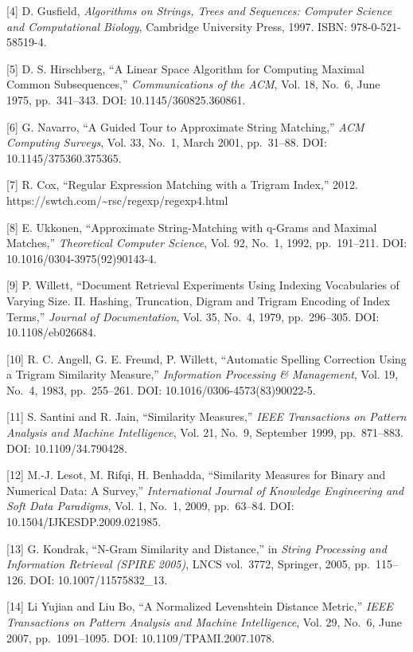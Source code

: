 \documentclass[
  11pt,
]{article}
\begin{document}
{[}4{]} D. Gusfield, \emph{Algorithms on Strings, Trees and Sequences:
Computer Science and Computational Biology}, Cambridge University Press,
1997. ISBN: 978-0-521-58519-4.

{[}5{]} D. S. Hirschberg, ``A Linear Space Algorithm for Computing
Maximal Common Subsequences,'' \emph{Communications of the ACM}, Vol.
18, No.~6, June 1975, pp.~341--343. DOI: 10.1145/360825.360861.

{[}6{]} G. Navarro, ``A Guided Tour to Approximate String Matching,''
\emph{ACM Computing Surveys}, Vol. 33, No.~1, March 2001, pp.~31--88.
DOI: 10.1145/375360.375365.

{[}7{]} R. Cox, ``Regular Expression Matching with a Trigram Index,''
2012. https://swtch.com/\textasciitilde rsc/regexp/regexp4.html

{[}8{]} E. Ukkonen, ``Approximate String-Matching with q-Grams and
Maximal Matches,'' \emph{Theoretical Computer Science}, Vol. 92, No.~1,
1992, pp.~191--211. DOI: 10.1016/0304-3975(92)90143-4.

{[}9{]} P. Willett, ``Document Retrieval Experiments Using Indexing
Vocabularies of Varying Size. II. Hashing, Truncation, Digram and
Trigram Encoding of Index Terms,'' \emph{Journal of Documentation}, Vol.
35, No.~4, 1979, pp.~296--305. DOI: 10.1108/eb026684.

{[}10{]} R. C. Angell, G. E. Freund, P. Willett, ``Automatic Spelling
Correction Using a Trigram Similarity Measure,'' \emph{Information
Processing \& Management}, Vol. 19, No.~4, 1983, pp.~255--261. DOI:
10.1016/0306-4573(83)90022-5.

{[}11{]} S. Santini and R. Jain, ``Similarity Measures,'' \emph{IEEE
Transactions on Pattern Analysis and Machine Intelligence}, Vol. 21,
No.~9, September 1999, pp.~871--883. DOI: 10.1109/34.790428.

{[}12{]} M.-J. Lesot, M. Rifqi, H. Benhadda, ``Similarity Measures for
Binary and Numerical Data: A Survey,'' \emph{International Journal of
Knowledge Engineering and Soft Data Paradigms}, Vol. 1, No.~1, 2009,
pp.~63--84. DOI: 10.1504/IJKESDP.2009.021985.

{[}13{]} G. Kondrak, ``N-Gram Similarity and Distance,'' in \emph{String
Processing and Information Retrieval (SPIRE 2005)}, LNCS vol.~3772,
Springer, 2005, pp.~115--126. DOI: 10.1007/11575832\_13.

{[}14{]} Li Yujian and Liu Bo, ``A Normalized Levenshtein Distance
Metric,'' \emph{IEEE Transactions on Pattern Analysis and Machine
Intelligence}, Vol. 29, No.~6, June 2007, pp.~1091--1095. DOI:
10.1109/TPAMI.2007.1078.
\end{document}
